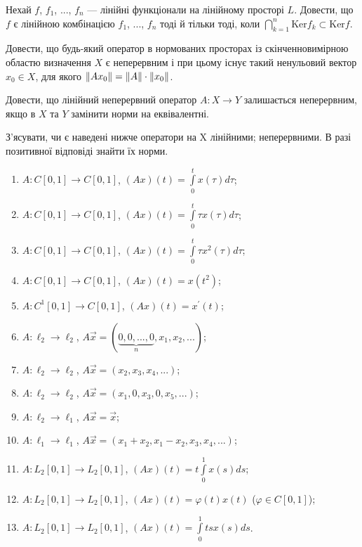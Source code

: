 \begin{exercise}
    Нехай $f$, $f_1$, ..., $f_n$ --- лінійні функціонали на лінійному просторі $L$. 
    Довести, що $f$ є лінійною комбінацією $f_1$, ..., $f_n$ тоді й тільки тоді, 
    коли $\bigcap\limits_{k=1}^n \mathrm{Ker} f_k \subset \mathrm{Ker} f$.
\end{exercise}

\begin{exercise}
    Довести, що будь-який оператор в нормованих просторах із скінченновимірною областю 
    визначення $X$ є неперервним і при цьому існує такий ненульовий вектор $x_0 \in X$, 
    для якого $\left\lVert Ax_0\right\rVert = \left\lVert A\right\rVert\cdot\left\lVert x_0\right\rVert$.
\end{exercise}

\begin{exercise}
    Довести, що лінійний неперервний оператор $A: X \rightarrow Y$ залишається неперервним, 
    якщо в $X$ та $Y$ замінити норми на еквівалентні.
\end{exercise}

\begin{exercise}
    З'ясувати, чи є наведені нижче оператори на X лінійними; 
    неперервними. В разі позитивної відповіді знайти їх норми.
    \begin{enumerate}[label=\ukr*)]
        \item $A: C[0, 1] \rightarrow C[0, 1]$, $(Ax)(t) = \int\limits_0^t x(\tau) d\tau$;
        \item $A: C[0, 1] \rightarrow C[0, 1]$, $(Ax)(t) = \int\limits_0^t \tau x(\tau) d\tau$;
        \item $A: C[0, 1] \rightarrow C[0, 1]$, $(Ax)(t) = \int\limits_0^t \tau x^2(\tau) d\tau$;
        \item $A: C[0, 1] \rightarrow C[0, 1]$, $(Ax)(t) = x(t^2)$;
        \item $A: C^1[0, 1] \rightarrow C[0, 1]$, $(Ax)(t) = x^\prime (t)$; 
        \item $A: \ell_2 \rightarrow \ell_2$, $A\vec{x} = (\underbrace{0,0,...,0}_n,
        x_1,x_2,...)$;
        \item $A: \ell_2 \rightarrow \ell_2$, $A\vec{x} = (x_2,x_3,x_4,...)$;
        \item $A: \ell_2 \rightarrow \ell_2$, $A\vec{x} = (x_1,0,x_3,0,x_5,...)$;
        \item $A: \ell_2 \rightarrow \ell_1$, $A\vec{x} = \vec{x}$;
        \item $A: \ell_1 \rightarrow \ell_1$, $A\vec{x} = (x_1+x_2, x_1-x_2, x_3, x_4, ...)$;
        \item $A: L_2[0, 1] \rightarrow L_2[0, 1]$, $(Ax)(t) = t \int\limits_0^1 x(s)ds$;
        \item $A: L_2[0, 1] \rightarrow L_2[0, 1]$, $(Ax)(t) = \varphi(t)x(t)$ 
        ($\varphi \in C[0,1]$);
        \item $A: L_2[0, 1] \rightarrow L_2[0, 1]$, $(Ax)(t) = \int\limits_0^1 tsx(s)ds$.
    \end{enumerate}
\end{exercise}
